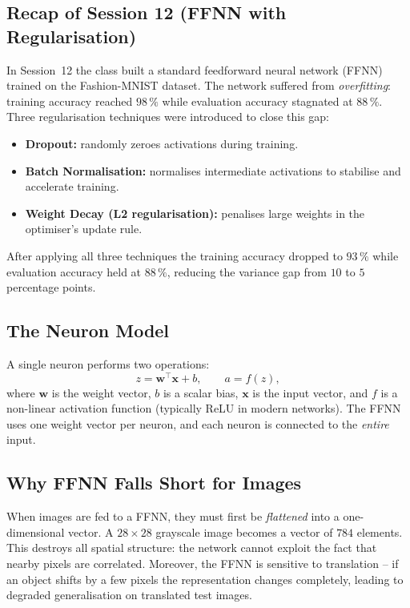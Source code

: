 \documentclass[12pt,a4paper]{article}
\begin{document}
\subsection{Recap of Session 12 (FFNN with Regularisation)}
\label{subsec:recap}

In Session~12 the class built a standard feedforward neural network (FFNN)
trained on the Fashion-MNIST dataset.  The network suffered from
\emph{overfitting}: training accuracy reached $98\,\%$ while evaluation
accuracy stagnated at $88\,\%$.  Three regularisation techniques were
introduced to close this gap:

\begin{itemize}[leftmargin=2em]
  \item \textbf{Dropout:} randomly zeroes activations during training.
  \item \textbf{Batch Normalisation:} normalises intermediate activations to
        stabilise and accelerate training.
  \item \textbf{Weight Decay (L2 regularisation):} penalises large weights in
        the optimiser's update rule.
\end{itemize}

After applying all three techniques the training accuracy dropped to $93\,\%$
while evaluation accuracy held at $88\,\%$, reducing the variance gap from
$10$ to $5$ percentage points.

\subsection{The Neuron Model}
\label{subsec:neuron}

A single neuron performs two operations:
\begin{equation}
  z = \mathbf{w}^{\top}\mathbf{x} + b, \qquad
  a = f(z),
  \label{eq:neuron}
\end{equation}
where $\mathbf{w}$ is the weight vector, $b$ is a scalar bias, $\mathbf{x}$
is the input vector, and $f$ is a non-linear activation function (typically
ReLU in modern networks).  The FFNN uses one weight vector per neuron, and
each neuron is connected to the \emph{entire} input.

\subsection{Why FFNN Falls Short for Images}
\label{subsec:ffnn_limit}

When images are fed to a FFNN, they must first be \emph{flattened} into a
one-dimensional vector.  A $28\times28$ grayscale image becomes a vector of
$784$ elements.  This destroys all spatial structure: the network cannot
exploit the fact that nearby pixels are correlated.  Moreover, the FFNN is
sensitive to translation -- if an object shifts by a few pixels the
representation changes completely, leading to degraded generalisation on
translated test images.
\end{document}
